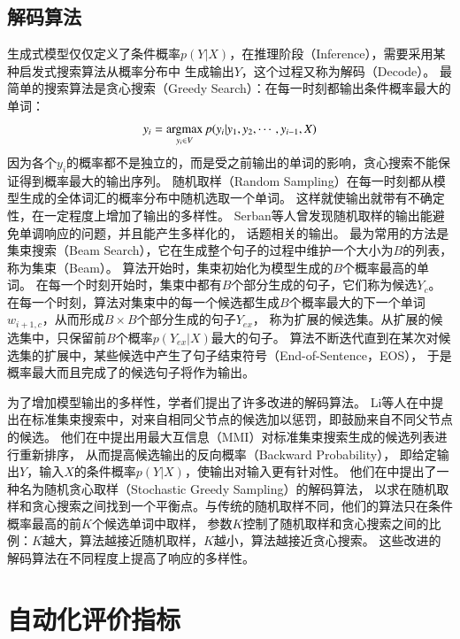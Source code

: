 \subsection{解码算法}\label{subsec:decode}
生成式模型仅仅定义了条件概率$p(Y|X)$，在推理阶段（Inference），需要采用某种启发式搜索算法从概率分布中
生成输出$Y$，这个过程又称为解码（Decode）。
最简单的搜索算法是贪心搜索（Greedy Search）：在每一时刻都输出条件概率最大的单词：
\begin{align}
    y_i = \operatorname*{argmax}_{y_i \in V} p(y_i|y_1, y_2, \cdots, y_{i-1}, X)
\end{align}
因为各个$y_i$的概率都不是独立的，而是受之前输出的单词的影响，贪心搜索不能保证得到概率最大的输出序列。
随机取样（Random Sampling）在每一时刻都从模型生成的全体词汇的概率分布中随机选取一个单词。
这样就使输出就带有不确定性，在一定程度上增加了输出的多样性。
Serban等人曾发现随机取样的输出能避免单调响应的问题，并且能产生多样化的，
话题相关的输出。
最为常用的方法是集束搜索（Beam Search），它在生成整个句子的过程中维护一个大小为$B$的列表，称为集束（Beam）。
算法开始时，集束初始化为模型生成的$B$个概率最高的单词。
在每一个时刻开始时，集束中都有$B$个部分生成的句子，它们称为候选$Y_c$。
在每一个时刻，算法对集束中的每一个候选都生成$B$个概率最大的下一个单词$w_{i+1, c}$，从而形成$B \times B$个部分生成的句子$Y_{ex}$，
称为扩展的候选集。从扩展的候选集中，只保留前$B$个概率$p(Y_{ex}|X)$最大的句子。
算法不断迭代直到在某次对候选集的扩展中，某些候选中产生了句子结束符号（End-of-Sentence，EOS），
于是概率最大而且完成了的候选句子将作为输出。

为了增加模型输出的多样性，学者们提出了许多改进的解码算法。
Li等人在\cite{DiverseBeam}中提出在标准集束搜索中，对来自相同父节点的候选加以惩罚，即鼓励来自不同父节点的候选。
他们在\cite{MMI}中提出用最大互信息（MMI）对标准集束搜索生成的候选列表进行重新排序，
从而提高候选输出的反向概率（Backward Probability），
即给定输出$Y$，输入$X$的条件概率$p(Y|X)$，使输出对输入更有针对性。
他们在\cite{Distill}中提出了一种名为随机贪心取样（Stochastic Greedy Sampling）的解码算法，
以求在随机取样和贪心搜索之间找到一个平衡点。与传统的随机取样不同，他们的算法只在条件概率最高的前$K$个候选单词中取样，
参数$K$控制了随机取样和贪心搜索之间的比例：$K$越大，算法越接近随机取样，$K$越小，算法越接近贪心搜索。
这些改进的解码算法在不同程度上提高了响应的多样性。

\section{自动化评价指标}\label{sec:automatic_metric}
